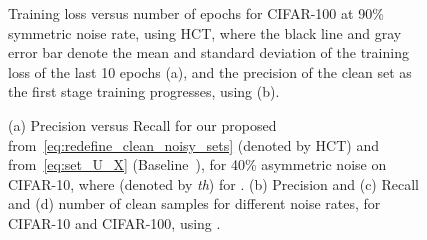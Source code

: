 \documentclass[review]{elsarticle}
\begin{document}
\begin{figure}[t]
\centering
{}\quad\quad
{}
\caption{Training loss versus number of epochs for CIFAR-100 at 90\% symmetric noise rate, using HCT, where the black line and gray error bar denote the mean and standard deviation of the training loss of the last 10 epochs (a), and the precision of the clean set as the first stage training progresses, using  (b).
}
\label{fig:loss_epoch}
\end{figure}





\begin{figure}[ht!]
\centering
{}\quad\quad
{}
\quad
{}


\caption{(a) Precision versus Recall for our proposed  from~\eqref{eq:redefine_clean_noisy_sets} (denoted by HCT) and  from~\eqref{eq:set_U_X} (Baseline~\cite{li2020dividemix}), for 40\% asymmetric noise on CIFAR-10, where  (denoted by \emph{th}) for . (b) Precision  and (c) Recall and (d) number of clean samples for different noise rates, for CIFAR-10 and CIFAR-100, using .}
\label{fig:precison}
\end{figure}
\end{document}
